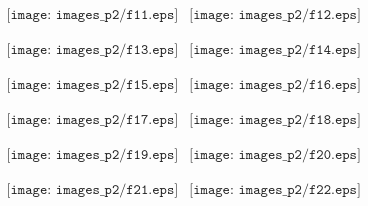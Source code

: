 \documentclass[a4paper,10pt]{article}
\begin{document}
\begin{figure}[h]
\begin{center}$
\begin{array}{cc}
\texttt{[image: images\_p2/f11.eps]} &
\texttt{[image: images\_p2/f12.eps]}
\end{array}$
\end{center}
\end{figure}

\begin{figure}[h]
\begin{center}$
\begin{array}{cc}
\texttt{[image: images\_p2/f13.eps]} &
\texttt{[image: images\_p2/f14.eps]}
\end{array}$
\end{center}
\end{figure}

\begin{figure}[h]
\begin{center}$
\begin{array}{cc}
\texttt{[image: images\_p2/f15.eps]} &
\texttt{[image: images\_p2/f16.eps]}
\end{array}$
\end{center}
\end{figure}

\begin{figure}[h]
\begin{center}$
\begin{array}{cc}
\texttt{[image: images\_p2/f17.eps]} &
\texttt{[image: images\_p2/f18.eps]}
\end{array}$
\end{center}
\end{figure}

\begin{figure}[h]
\begin{center}$
\begin{array}{cc}
\texttt{[image: images\_p2/f19.eps]} &
\texttt{[image: images\_p2/f20.eps]}
\end{array}$
\end{center}
\end{figure}

\begin{figure}[h]
\begin{center}$
\begin{array}{cc}
\texttt{[image: images\_p2/f21.eps]} &
\texttt{[image: images\_p2/f22.eps]}
\end{array}$
\end{center}
\end{figure}
\end{document}

